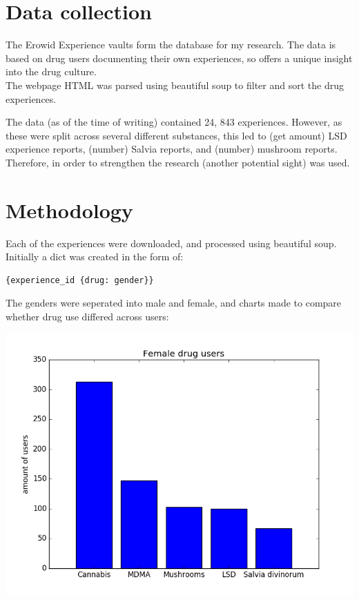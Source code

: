 \documentclass{article}
\begin{document}
\section{Data collection}
The Erowid Experience vaults form the database for my research. The data is based on drug users documenting their own experiences, so offers a unique insight into the drug culture. \\ 
The webpage HTML was parsed using beautiful soup to filter and sort the drug experiences. 

The data (as of the time of writing) contained 24, 843 experiences. However, as these were split across several different substances, this led to (get amount) LSD experience reports, (number) Salvia reports, and (number) mushroom reports. Therefore, in order to strengthen the research (another potential sight) was used. 

\section{Methodology}

Each of the experiences were downloaded, and processed using beautiful soup. Initially a dict was created in the form of:

\begin{lstlisting}
{experience_id {drug: gender}}
\end{lstlisting}

The genders were seperated into male and female, and charts made to compare whether drug use differed across users:

\includegraphics{female_top5}
\end{document}
